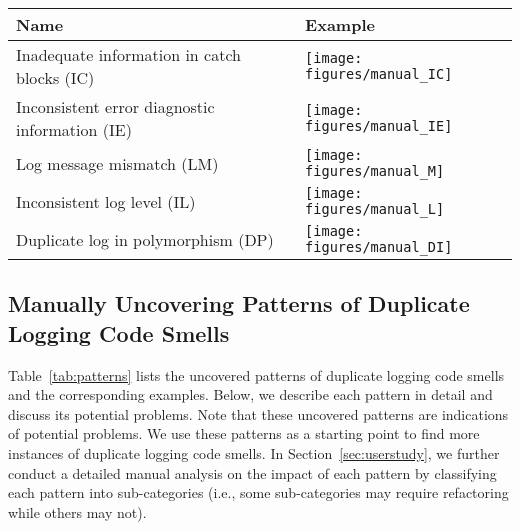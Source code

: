 \begin{table*}
\caption{Patterns of duplicate logging code smells 
and corresponding examples.} %
\centering

\begin{tabular}{m{} | m{}  }%
\toprule
\textbf{Name} & \textbf{Example} \\
\midrule
Inadequate information in catch blocks (IC) & 
\texttt{[image: figures/manual\_IC]}

\\
\midrule
Inconsistent error diagnostic information (IE) & \texttt{[image: figures/manual\_IE]}
\\
\midrule
Log message mismatch (LM) & \texttt{[image: figures/manual\_M]}
\\

\midrule
Inconsistent log level (IL) & \texttt{[image: figures/manual\_L]}
\\


\midrule
Duplicate log in polymorphism (DP) & \texttt{[image: figures/manual\_DI]}
\\


\bottomrule
\end{tabular}
\label{tab:patterns}
\end{table*}

\subsection{Manually Uncovering Patterns of Duplicate Logging Code Smells}
 Table~\ref{tab:patterns} lists the uncovered patterns of duplicate logging code smells and the corresponding examples. Below, we describe each pattern in detail and discuss its potential problems. Note that these uncovered patterns are indications of potential problems. We use these patterns as a starting point to find more instances of duplicate logging code smells. In Section~\ref{sec:userstudy}, we further conduct a detailed manual analysis on the impact of each pattern by classifying each pattern into sub-categories (i.e., some sub-categories may require refactoring while others may not). 

